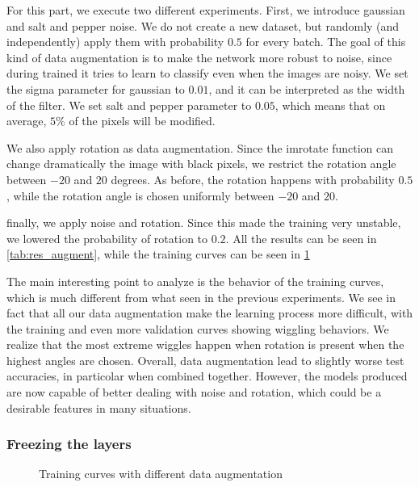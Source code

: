 \documentclass{article}
\begin{document}
For this part, we execute two different experiments. First, we introduce gaussian and salt and pepper noise. We do not create a new dataset, but randomly (and independently) apply them with probability $0.5$ for every batch. The goal of this kind of data augmentation is to make the network more robust to noise, since during trained it tries to learn to classify even when the images are noisy. We set the sigma parameter for gaussian to $0.01$, and it can be interpreted as the width of the filter. We set salt and pepper parameter to $0.05$, which means that on average, $5\%$ of the pixels will be modified.

We also apply rotation as data augmentation. Since the imrotate function can change dramatically the image with black pixels, we restrict the rotation angle between $-20$ and $20$ degrees. As before, the rotation happens with probability $0.5$, while the rotation angle is chosen uniformly between $-20$ and $20$.

finally, we apply noise and rotation. Since this made the training very unstable, we lowered the probability of rotation to $0.2$. All the results can be seen in \cref{tab:res_augment}, while the training curves can be seen in \cref{fig:augment}

The main interesting point to analyze is the behavior of the training curves, which is much different from what seen in the previous experiments. We see in fact that all our data augmentation make the learning process more difficult, with the training and even more validation curves showing wiggling behaviors. We realize that the most extreme wiggles happen when rotation is present when the highest angles are chosen. Overall, data augmentation lead to slightly worse test accuracies, in particolar when combined together. However, the models produced are now capable of better dealing with noise and rotation, which could be a desirable features in many situations.

\subsubsection{Freezing the layers}

\begin{figure}[h]
    \centering
    \caption{Training curves with different data augmentation}

\label{fig:augment}
\end{figure}
\end{document}

